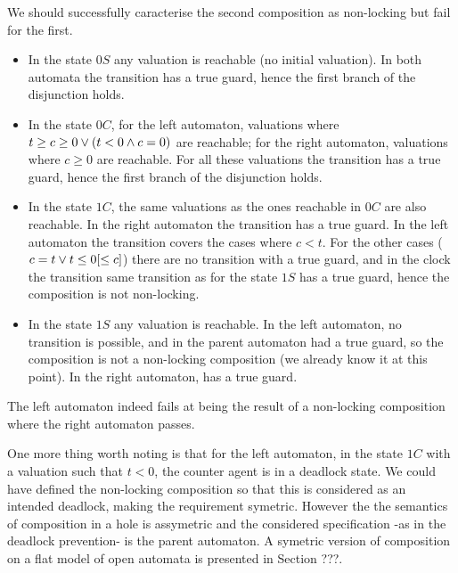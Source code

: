 \documentclass{article}
\begin{document}
\begin{exi}
We should successfully caracterise the second composition as non-locking but fail for the first.
\begin{itemize}
\item In the state \(0S\) any valuation is reachable (no initial valuation).
	In both automata the transition  has a true guard, hence the first branch of the disjunction holds.
\item In the state \(0C\), for the left automaton, valuations where \(t \geq c \geq 0 \vee {\left(t < 0 \wedge c = 0\right)}\) are reachable; for the right automaton, valuations where \(c \geq 0\) are reachable.
	For all these valuations the transition  has a true guard, hence the first branch of the disjunction holds.
\item In the state \(1C\), the same valuations as the ones reachable in \(0C\) are also reachable.
	In the right automaton the transition  has a true guard.
	In the left automaton the transition  covers the cases where \(c < t\).
	For the other cases (\(c = t \vee t \leq 0 {\left[\leq c\right]}\)) there are no transition with a true guard, and in the clock the transition same transition as for the state \(1S\) has a true guard, hence the composition is not non-locking.
\item In the state \(1S\) any valuation is reachable.
	In the left automaton, no transition is possible, and in the parent automaton  had a true guard, so the composition is not a non-locking composition (we already know it at this point).
	In the right automaton,  has a true guard.
\end{itemize}
The left automaton indeed fails at being the result of a non-locking composition where the right automaton passes.

One more thing worth noting is that for the left automaton, in the state \(1C\) with a valuation such that \(t < 0\), the counter agent is in a deadlock state.
We could have defined the non-locking composition so that this is considered as an intended deadlock, making the requirement symetric.
However the the semantics of composition in a hole is assymetric and the considered specification -as in the deadlock prevention- is the parent automaton.
A symetric version of composition on a flat model of open automata is presented in Section ???.
\end{exi}
\end{document}

